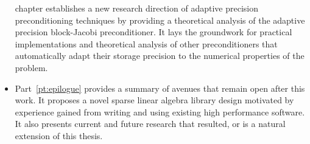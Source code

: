 \begin{itemize}
chapter establishes a new research direction of adaptive precision
preconditioning techniques by providing a theoretical analysis of the adaptive
precision block-Jacobi preconditioner. It lays the groundwork for practical
implementations and theoretical analysis of other preconditioners that
automatically adapt their storage precision to the numerical properties of the
problem.
\item Part~\ref{pt:epilogue} provides a summary of avenues that remain open
after this work. It proposes a novel sparse linear algebra library design
motivated by experience gained from writing and using existing high performance
software. It also presents current and future research that resulted, or is a
natural extension of this thesis.
\end{itemize}
